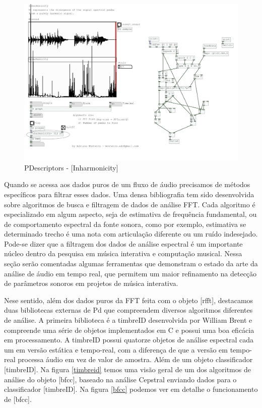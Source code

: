 \documentclass[draft]{ppgmus}
\begin{document}
\begin{figure}
\includegraphics[scale=.28]{pdescriptor}
\caption{PDescriptors - [Inharmonicity\texttildelow]}
\label{pdescriptor}
\end{figure} 


Quando se acessa aos dados puros de um fluxo de áudio precisamos de 
métodos específicos para filtrar esses dados. Uma densa bibliografia
tem sido desenvolvida sobre algoritmos de busca e filtragem de dados de
análise FFT. Cada algoritmo é especializado em algum aspecto, seja de
estimativa de frequência fundamental, ou de comportamento espectral da fonte sonora,
como por exemplo, estimativa se determinado trecho é uma nota com articulação diferente
ou um ruído indesejado.
Pode-se dizer que a filtragem dos dados de análise espectral é um importante
núcleo dentro da pesquisa em música interativa e computação musical. Nessa seção
serão comentadas algumas ferramentas que demonstram o estado da arte da análise de 
áudio em tempo real, que permitem um maior refinamento na detecção de parâmetros
sonoros em projetos de música interativa.

Nese sentido, além dos dados puros da FFT feita com o objeto [rfft\texttildelow],
destacamos duas bibliotecas externas de Pd que compreendem diversos algoritmos
diferentes de análise. A primeira biblioteca é a 
timbreID \cite{brentcepstral} desenvolvida por William Brent e compreende uma série de objetos
implementados em C e possui uma boa eficácia em processamento. A timbreID possui 
quatorze objetos de análise espectral cada um em versão estática e tempo-real, com a diferença
de que a versão em tempo-real processa áudio em vez de valor de amostra. Além
de um objeto classificador [timbreID]. Na figura \ref{timbreid} temos
uma visão geral de um dos algoritmos de análise do objeto  [bfcc\texttildelow], baseado na 
análise Cepstral enviando dados para o classificador [timbreID]. Na figura \ref{bfcc} podemos
ver em detalhe o funcionamento de [bfcc\texttildelow].
\end{document}
